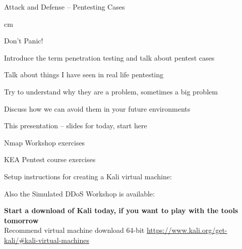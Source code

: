 \documentclass[Screen16to9,17pt]{foils}
\begin{document}
{}

\mytitlepage
{Attack and Defense -- Pentesting Cases}


 cm

\centerline{\color{titlecolor}\LARGE Don't Panic!}


\begin{list1}
\item Introduce the term penetration testing and talk about pentest cases
\item Talk about things I have seen in real life pentesting
\item Try to understand why they are a problem, sometimes a big problem
\item Discuss how we can avoid them in your future environments
\end{list1}


\begin{list2}
\item This presentation -- slides for today, start here
\item Nmap Workshop exercises\\{\footnotesize
{}}
\item KEA Pentest course exercises\\{\footnotesize
{}}
\item Setup instructions for creating a Kali virtual machine:\\
\item Also the Simulated DDoS Workshop is available:\\{\footnotesize
{}}
\end{list2}


{\bf Start a download of Kali today, if you want to play with the tools tomorrow}\\
Recommend virtual machine download 64-bit \url{https://www.kali.org/get-kali/#kali-virtual-machines}
\end{document}
